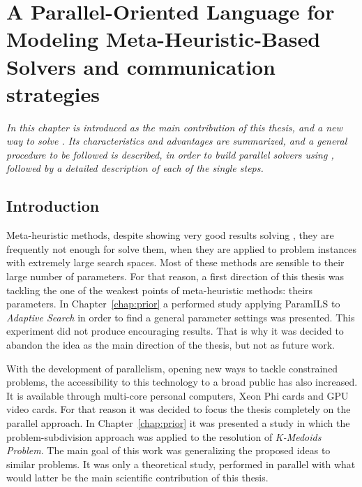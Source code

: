 \chapter{A Parallel-Oriented Language for Modeling Meta-Heuristic-Based Solvers and communication strategies}
\label{chap:posl}
\textit{In this chapter \posl{} is introduced as the main contribution of this thesis, and a new way to solve \csps{}. Its characteristics and advantages are summarized, and a general procedure to be followed is described, in order to build parallel solvers using \posl, followed by a detailed description of each of the single steps.}
\vfill
\minitoc
\newpage

\section{Introduction}

Meta-heuristic methods, despite showing very good results solving \CSPs, they are frequently not enough for solve them, when they are applied to problem instances with extremely large search spaces. Most of these methods are sensible to their large number of parameters. For that reason, a first direction of this thesis was tackling the one of the weakest points of meta-heuristic methods: theirs parameters. In Chapter~\ref{chap:prior} a performed study applying {\sc ParamILS} to {\it Adaptive Search} in order to find a general parameter settings was presented. This experiment did not produce encouraging results. That is why it was decided to abandon the idea as the main direction of the thesis, but not as future work.

With the development of parallelism, opening new ways to tackle constrained problems, the accessibility to this technology to a broad public has also increased. It is available through multi-core personal computers, Xeon Phi cards and GPU video cards. For that reason it was decided to focus the thesis completely on the parallel approach. In Chapter~\ref{chap:prior} it was presented a study in which the problem-subdivision approach was applied to the resolution of {\it K-Medoids Problem}. The main goal of this work was generalizing the proposed ideas to similar problems. It was only a theoretical study, performed in parallel with what would latter be the main scientific contribution of this thesis.

